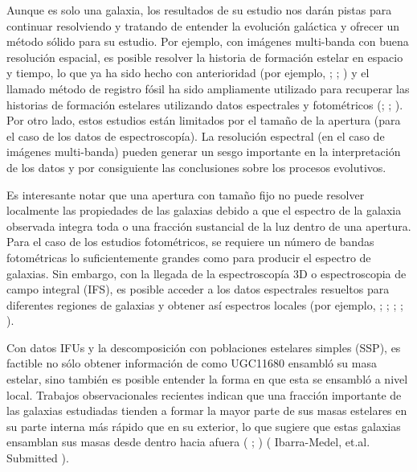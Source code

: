 \noindent Aunque es solo una galaxia, los resultados de su estudio  nos darán pistas para continuar resolviendo y tratando de entender la evolución galáctica y ofrecer un método sólido para su estudio. Por ejemplo, con imágenes multi-banda con buena resolución espacial, es posible resolver la historia de formación estelar en espacio y tiempo, lo que ya ha sido hecho con anterioridad (por ejemplo, \citet{brinchmann2000}; \citet{kong2000}; \citet{perezg2008}) y el llamado método de registro fósil ha sido
ampliamente utilizado para recuperar las historias de formación estelares
utilizando  datos espectrales y fotométricos (\citet{kaufmann2006}; \citet{cid2005}; \citet{gallazzi2005}).
Por otro lado, estos estudios están limitados por el tamaño de la apertura (para el caso de los datos de espectroscopía).
La resolución espectral (en el caso de imágenes multi-banda) pueden generar un sesgo importante en la interpretación de los datos y por consiguiente las conclusiones sobre los procesos evolutivos.

\bigskip

\noindent Es interesante notar que una apertura con tamaño fijo no puede resolver localmente las propiedades de las galaxias debido a que el espectro de la galaxia observada integra toda o una fracción sustancial de la luz dentro de una apertura. Para el caso de los estudios fotométricos, se requiere un número de bandas fotométricas lo suficientemente grandes como para
producir el espectro de galaxias. Sin embargo, con la llegada de la espectroscopía 3D o espectroscopia de campo integral (IFS),  es
posible acceder a los datos espectrales resueltos para diferentes
regiones de galaxias y obtener así espectros locales (por ejemplo, \cite{cappellari2012}; \cite{croom2012}; \cite{sanchez2012}; \cite{cid2013_1}; \cite{bundy2015} ).

\bigskip


\noindent Con datos IFUs y  la descomposición con poblaciones estelares simples (SSP), es factible no sólo
obtener información de como UGC11680 ensambló su  masa estelar, sino también es posible entender la forma en que esta se ensambló a nivel local. Trabajos observacionales recientes indican que una fracción importante
de las galaxias estudiadas tienden a formar la mayor parte de sus masas estelares en su parte interna más rápido que en su exterior,
lo que sugiere que estas galaxias ensamblan sus masas
desde dentro hacia afuera ( \citet{blazquez2007}; \cite{perez2013}) ({\color{red} Ibarra-Medel, et.al. Submitted }).

\bigskip

